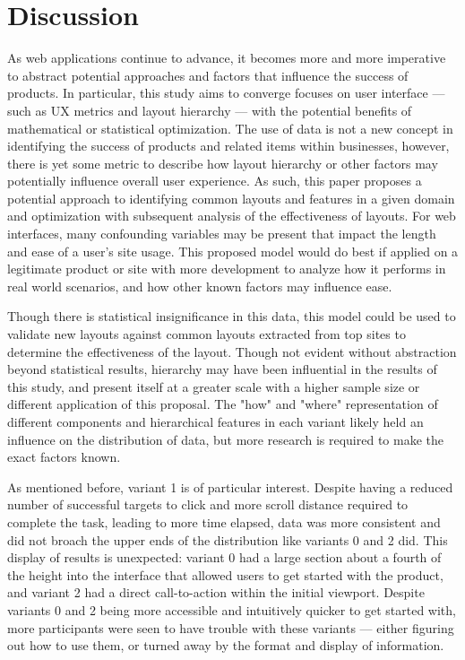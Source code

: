 \documentclass[conference]{IEEEtran}
\begin{document}
 
\section{Discussion}

As web applications continue to advance, it becomes more and more imperative to abstract potential approaches and factors that influence the success of products. In particular, this study aims to converge focuses on user interface — such as UX metrics and layout hierarchy — with the potential benefits of mathematical or statistical optimization. The use of data is not a new concept in identifying the success of products and related items within businesses, however, there is yet some metric to describe how layout hierarchy or other factors may potentially influence overall user experience. As such, this paper proposes a potential approach to identifying common layouts and features in a given domain and optimization with subsequent analysis of the effectiveness of layouts. For web interfaces, many confounding variables may be present that impact the length and ease of a user's site usage. This proposed model would do best if applied on a legitimate product or site with more development to analyze how it performs in real world scenarios, and how other known factors may influence ease. 

Though there is statistical insignificance in this data, this model could be used to validate new layouts against common layouts extracted from top sites to determine the effectiveness of the layout. Though not evident without abstraction beyond statistical results, hierarchy may have been influential in the results of this study, and present itself at a greater scale with a higher sample size or different application of this proposal. The "how" and "where" representation of different components and hierarchical features in each variant likely held an influence on the distribution of data, but more research is required to make the exact factors known.

As mentioned before, variant 1 is of particular interest. Despite having a reduced number of successful targets to click and more scroll distance required to complete the task, leading to more time elapsed, data was more consistent and did not broach the upper ends of the distribution like variants 0 and 2 did. This display of results is unexpected: variant 0 had a large section about a fourth of the height into the interface that allowed users to get started with the product, and variant 2 had a direct call-to-action within the initial viewport. Despite variants 0 and 2 being more accessible and intuitively quicker to get started with, more participants were seen to have trouble with these variants — either figuring out how to use them, or turned away by the format and display of information.
\end{document}
